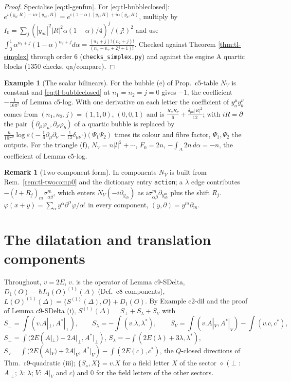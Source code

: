 \documentclass[11pt]{article}
\numberwithin{equation}{section}
\theoremstyle{plain}
\theoremstyle{definition}
\newtheorem{example}[theorem]{Example}
\newtheorem{remark}[theorem]{Remark}
\begin{document}
\begin{proof}
Specialise \eqref{eq:tl-genfun}. For \eqref{eq:tl-bubbleclosed}: $e^{i(y_b,R)-i\alpha(y_{ab},R)}=e^{i(1-\alpha)(y_b,R)+i\alpha(y_a,R)}$, multiply by $I_0=\sum_j(|y_{ab}|^2|R|^2\alpha(1-\alpha)/4)^j/(j!)^2$ and use $\int_0^1\alpha^{n_1+j}(1-\alpha)^{n_2+j}d\alpha=\frac{(n_1+j)!(n_2+j)!}{(n_1+n_2+2j+1)!}$. Checked against Theorem \ref{thm:tl-simplex} through order $6$ (\texttt{checks\_simplex.py}) and against the engine A quartic blocks (1350 checks, qa/compare).
\end{proof}

\begin{example}[The scalar bilinears]
For the bubble (e) of Prop.~c5-table $N_V$ is constant and \eqref{eq:tl-bubbleclosed} at $n_1=n_2=j=0$ gives $-1$, the coefficient $-\frac1{16\pi^2}$ of Lemma c5-log. With one derivative on each letter the coefficient of $y_a^\mu y_b^\nu$ comes from $(n_1,n_2,j)=(1,1,0)$, $(0,0,1)$ and is $\frac{R_\mu R_\nu}6+\frac{\delta_{\mu\nu}|R|^2}{12}$; with $iR=\partial$ the pair $(\partial_\mu\varphi_a,\partial_\nu\varphi_b)$ of a quartic bubble is replaced by $\frac{\hbar}{16\pi^2}\log\varepsilon\,\big(-\tfrac16\partial_\mu\partial_\nu-\tfrac1{12}\delta_{\mu\nu}\square\big)(\Psi_1\Psi_2)$ times its colour and fibre factor, $\Psi_1,\Psi_2$ the outputs. For the triangle (f), $N_V=n|l|^2+\cdots$, $F_0=2n$, $-\int_\Delta2n\,d\alpha=-n$, the coefficient of Lemma c5-log.
\end{example}

\begin{remark}[Two-component form]
In components $N_V$ is built from Rem.~\ref{rem:tl-twocomp0} and the dictionary entry \texttt{action}; a $\lambda$ edge contributes $-(l+R_j)_m\sigma^m_{\alpha\dot\beta}$, which enters $N_V(-i\partial_{y_{ab}})$ as $i\sigma^m_{\alpha\dot\beta}\partial_{y_{ab}^m}$ plus the shift $R_j$. $\varphi(x+y)=\sum_\alpha y^\alpha\partial^\alpha\varphi/\alpha!$ in every component, $(y,\partial)=y^m\partial_m$.
\end{remark}


\section{The dilatation and translation components}
\label{sec:tl-D1}

Throughout, $v=2E$, $v.$ is the operator of Lemma c9-SDelta, $D_1(O)=\hbar L_1(O)^{(1)}(\Delta)$ (Def.~c8-components), $L(O)^{(1)}(\Delta)=\{S^{(1)}(\Delta),O\}+D_1(O)$. By Example c2-dil and the proof of Lemma c9-SDelta (i), $S^{(1)}(\Delta)=S_\perp+S_\lambda+S_V$ with
\[
S_\perp=\int(v.A|_\perp,A^*|_\perp),\qquad S_\lambda=-\int(v.\lambda,\lambda^*),\qquad S_V=\int(v.A|_V,A^*|_V)-\int(v.c,c^*),
\]
$S_\perp=\int(2E(A|_\perp)+2A|_\perp,A^*|_\perp)$, $S_\lambda=-\int(2E(\lambda)+3\lambda,\lambda^*)$, $S_V=\int(2E(A|_V)+2A|_V,A^*|_V)-\int(2E(c),c^*)$, the $Q$-closed directions of Thm.~c9-quadratic (iii); $\{S_\diamond,X\}=v.X$ for a field letter $X$ of the sector $\diamond$ ($\perp$: $A|_\perp$; $\lambda$: $\lambda$; $V$: $A|_V$ and $c$) and $0$ for the field letters of the other sectors.
\end{document}
